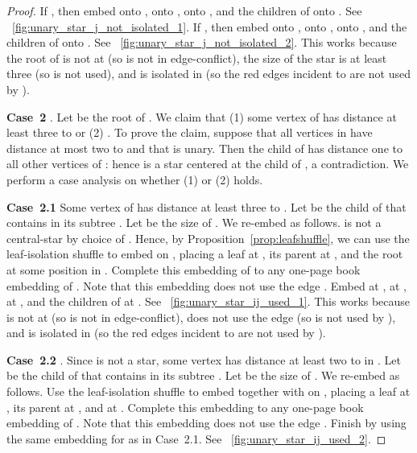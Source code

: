 \documentclass[11pt,a4paper,colorlinks=true,urlcolor=blue,citecolor=red]{article}
\theoremstyle{plain}
\newcommand{\case}[1]{\par\vspace{.5\baselineskip}\noindent\textbf{\sffamily Case~#1}}
\begin{document}
\begin{proof}
  If , then embed  onto ,  onto ,  onto
  , and the children of  onto . See
  \figurename~\ref{fig:unary_star_j_not_isolated_1}. If
  , then embed  onto ,  onto ,  onto
  , and the children of  onto . See
  \figurename~\ref{fig:unary_star_j_not_isolated_2}. This works because
  the root of  is not at  (so  is not in
  edge-conflict), the size of the star  is at least three
  (so  is not used), and  is isolated in  (so the
  red edges incident to  are not used by ).

  \case{2} . Let  be the root of .
  We claim that (1) some vertex of  has distance at least three
  to  or (2) . To prove the claim, suppose
  that all vertices in  have distance at most two to  and
  that  is unary. Then the child of  has distance one to all other
  vertices of : hence  is a star centered at the child
  of , a contradiction. We perform a case analysis on whether (1) or
  (2) holds.

  \case{2.1} Some vertex  of  has distance at least three to
  . Let  be the child of  that contains  in its subtree
  . Let  be the size of . We re-embed  as follows.
   is not a central-star by choice of . Hence, by
  Proposition~\ref{prop:leafshuffle}, we can use the leaf-isolation
  shuffle to embed  on , placing a leaf at , its
  parent at , and the root  at some position in .
  Complete this embedding of  to any one-page book embedding of
  . Note that this embedding does not use the edge
  . Embed  at ,  at ,  at , and the
  children of  at . See
  \figurename~\ref{fig:unary_star_ij_used_1}. This works because  is
  not at  (so  is not in edge-conflict),  does not use the
  edge  (so  is not used by ), and  is
  isolated in  (so the red edges incident to  are not used
  by ).

  \case{2.2} . Since  is not a star,
  some vertex  has distance at least two to  in . Let 
  be the child of  that contains  in its subtree . Let  be
  the size of . We re-embed  as follows. Use the
  leaf-isolation shuffle to embed  together with  on ,
  placing a leaf at , its parent at , and  at . Complete
  this embedding to any one-page book embedding of . Note that
  this embedding does not use the edge . Finish by using the
  same embedding for  as in Case~2.1. See
  \figurename~\ref{fig:unary_star_ij_used_2}.
\end{proof}
\end{document}
